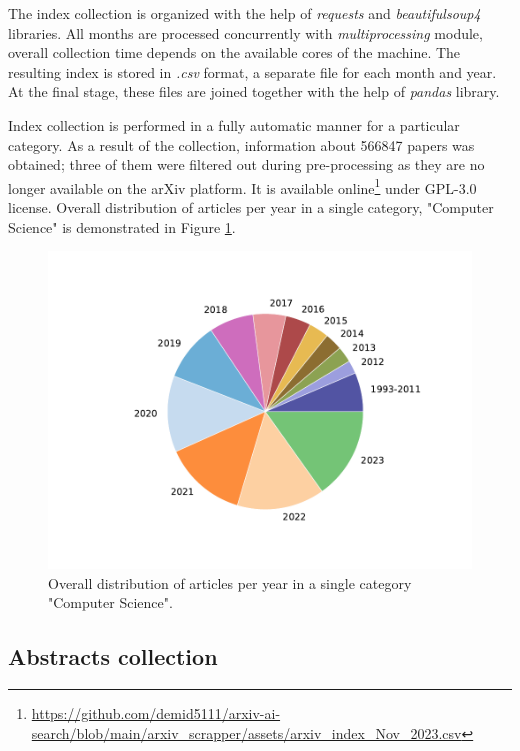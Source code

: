 \documentclass{article}
\begin{document}
        The index collection is organized with the help of \textit{requests} and \textit{beautifulsoup4} libraries. All months are processed concurrently with \textit{multiprocessing} module, overall collection time depends on the available cores of the machine. The resulting index is stored in \textit{.csv} format, a separate file for each month and year. At the final stage, these files are joined together with the help of \textit{pandas} library.

        Index collection is performed in a fully automatic manner for a particular category. As a result of the collection, information about 566847 papers was obtained; three of them were filtered out during pre-processing as they are no longer available on the arXiv platform. It is available online\footnote{\url{https://github.com/demid5111/arxiv-ai-search/blob/main/arxiv_scrapper/assets/arxiv_index_Nov_2023.csv}} under GPL-3.0 license. Overall distribution of articles per year in a single category, "Computer Science" is demonstrated in Figure \ref{fig:articles-pie}.

        \begin{figure}[H]
            \centering
            \includegraphics[width=0.99\linewidth]{img/articles_in_every_year.pdf}
            \caption{Overall distribution of articles per year in a single category "Computer Science".}
            \label{fig:articles-pie}
        \end{figure}

    \subsection{Abstracts collection}
\end{document}
